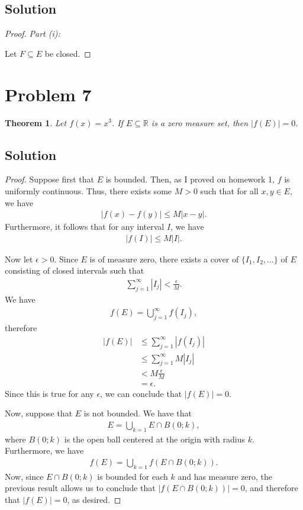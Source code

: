 \documentclass[10pt,a4paper]{article}
\makeatletter
\theoremstyle{theorem}
\newtheorem{theorem}{Theorem}
\newcommand{\proofpart}[2]{%
  \par
  \addvspace{\medskipamount}%
  \noindent\emph{Part #1: #2}\par\nobreak
  \addvspace{\smallskipamount}%
  \@afterheading
}
\theoremstyle{definition}
\makeatother
\begin{document}
\subsection*{Solution}
\begin{proof}
\proofpart{(i)}{}
Let $F \subseteq E$ be closed.
\end{proof}

\section*{Problem 7}
\begin{theorem}
Let $f(x) = x^3$.  If $E \subseteq \mathbb{R}$ is a zero measure set, then $|f(E)| = 0$.
\end{theorem}

\subsection*{Solution}
\begin{proof}
Suppose first that $E$ is bounded. Then, as I proved on homework 1, $f$ is uniformly continuous. Thus, there exists some $M > 0$ such that for all $x,y \in E$, we have
\begin{align*}
|f(x) - f(y)| \leq M|x - y|.
\end{align*}
Furthermore, it follows that for any interval $I$, we have
\begin{align*}
|f(I)| \leq M|I|.
\end{align*}

Now let $\epsilon > 0$. Since $E$ is of measure zero, there exists a cover of $\{I_1, I_2,...\}$ of $E$ consisting of closed intervals such that 
\begin{align*}
\sum_{j=1}^\infty |I_j| < \frac{\epsilon}{M}.
\end{align*} 
We have
\begin{align*}
f(E) = \bigcup_{j=1}^\infty f(I_j),
\end{align*}
therefore
\begin{align*}
|f(E)| &\leq \sum_{j=1}^\infty |f(I_j)| \\
&\leq \sum_{j=1}^\infty M|I_j| \\
&< M \frac{\epsilon}{M}\\
&= \epsilon.
\end{align*}
Since this is true for any $\epsilon$, we can conclude that $|f(E)| = 0$. 

Now, suppose that $E$ is not bounded. We have that
\begin{align*}
E = \bigcup_{k = 1} E \cap B(0; k),
\end{align*}
where $B(0; k)$ is the open ball centered at the origin with radius $k$.  Furthermore, we have
\begin{align*}
f(E) = \bigcup_{k = 1} f(E \cap B(0; k)).
\end{align*}
Now, since $E \cap B(0; k)$ is bounded for each $k$ and has measure zero, the previous result allows us to conclude that $|f(E \cap B(0; k))| = 0$, and therefore that $|f(E)| = 0$, as desired.
\end{proof}
\end{document}

